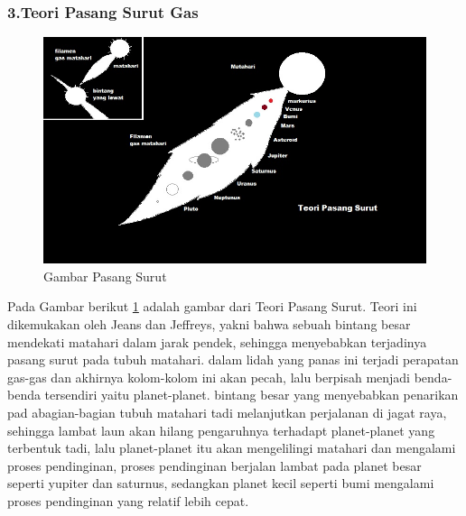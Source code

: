\subsubsection{3.Teori Pasang Surut Gas}
\begin{figure} [ht]
	\centerline{\includegraphics[width=1\textwidth]{figures/teoripasangsurut.JPG}}
	\caption{Gambar Pasang Surut}
	\label{teoripasangsurut}
	\end{figure}
	Pada Gambar berikut \ref{teoripasangsurut} adalah gambar dari Teori Pasang Surut.
Teori ini dikemukakan oleh Jeans dan Jeffreys, yakni bahwa sebuah bintang besar mendekati matahari dalam jarak pendek, sehingga menyebabkan terjadinya pasang surut pada tubuh matahari. dalam lidah yang panas ini terjadi perapatan gas-gas dan akhirnya kolom-kolom ini akan pecah, lalu berpisah menjadi benda-benda tersendiri yaitu planet-planet. bintang besar yang menyebabkan penarikan pad abagian-bagian tubuh matahari tadi melanjutkan perjalanan di jagat raya, sehingga lambat laun akan hilang pengaruhnya terhadapt planet-planet yang terbentuk tadi, lalu planet-planet itu akan mengelilingi matahari dan mengalami proses pendinginan, proses pendinginan berjalan lambat pada planet besar seperti yupiter dan saturnus, sedangkan planet kecil seperti bumi mengalami proses pendinginan yang relatif lebih cepat.

